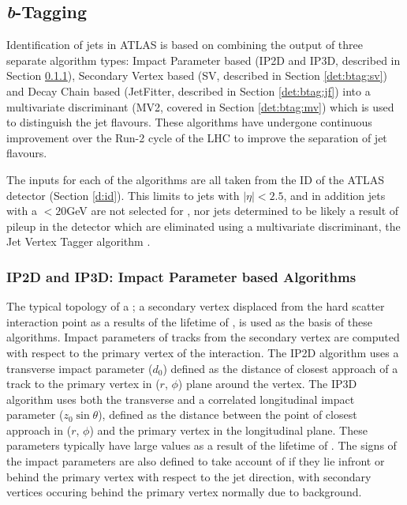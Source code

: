 \subsection{\textit{b}-Tagging}
\label{det:btagging}

	Identification of \bquark jets in ATLAS is based on combining the output of three separate \btag algorithm types: Impact Parameter based (IP2D and IP3D, described in Section \ref{det:btag:ip}), Secondary Vertex based (SV, described in Section \ref{det:btag:sv}) and Decay Chain based (JetFitter, described in Section \ref{det:btag:jf}) into a multivariate discriminant (MV2, covered in Section \ref{det:btag:mv}) which is used to distinguish the jet flavours. These algorithms have undergone continuous improvement over the Run-2 cycle of the LHC to improve the separation of jet flavours.

	The inputs for each of the \btagging algorithms are all taken from the ID of the ATLAS detector (Section \ref{d:id}). This limits \btagging to jets with $|\eta|<2.5$, and in addition jets with a \pt$<20$GeV are not selected for \btagging, nor jets determined to be likely a result of pileup in the detector which are eliminated using a multivariate discriminant, the Jet Vertex Tagger algorithm \cite{btagOptimisation, pileup}.

	\subsubsection{IP2D and IP3D: Impact Parameter based Algorithms}
		\label{det:btag:ip}

		The typical topology of a \bhadron; a secondary vertex displaced from the hard scatter interaction point as a results of the lifetime of \bquark, is used as the basis of these algorithms. Impact parameters of tracks from the secondary vertex are computed with respect to the primary vertex of the interaction. The IP2D algorithm uses a transverse impact parameter ($d_0$) defined as the distance of closest approach of a track to the  primary vertex in ($r$, $\phi$) plane around the vertex. The IP3D algorithm uses both the transverse and a correlated longitudinal impact parameter ($z_0\sin\theta$), defined as the distance between the point of closest approach in ($r$, $\phi$) and the primary vertex in the longitudinal plane. These parameters typically have large values as a result of the lifetime of \bquark. The signs of the impact parameters are also defined to take account of if they lie infront or behind the primary vertex with respect to the jet direction, with secondary vertices occuring behind the primary vertex normally due to background.

